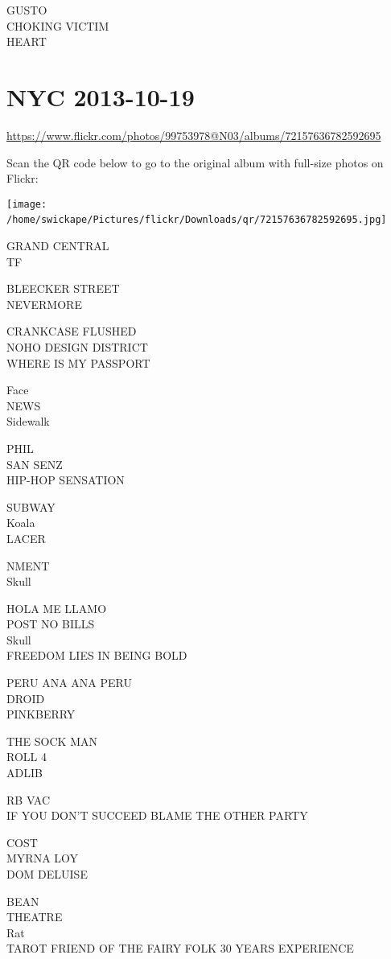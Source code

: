 \documentclass[10pt,letterpaper]{article}
\begin{document}
GUSTO\\
CHOKING VICTIM\\
HEART
\

\section*{NYC 2013-10-19}

\url{https://www.flickr.com/photos/99753978@N03/albums/72157636782592695}

Scan the QR code below to go to the original album with full-size photos on Flickr:

\texttt{[image: /home/swickape/Pictures/flickr/Downloads/qr/72157636782592695.jpg]}
\

GRAND CENTRAL\\
TF

BLEECKER STREET\\
NEVERMORE

CRANKCASE FLUSHED\\
NOHO DESIGN DISTRICT\\
WHERE IS MY PASSPORT

Face\\
NEWS\\
Sidewalk

PHIL\\
SAN SENZ\\
HIP{-}HOP SENSATION

SUBWAY\\
Koala\\
LACER

NMENT\\
Skull

HOLA ME LLAMO\\
POST NO BILLS\\
Skull\\
FREEDOM LIES IN BEING BOLD

PERU ANA ANA PERU\\
DROID\\
PINKBERRY

THE SOCK MAN\\
ROLL 4\\
ADLIB

RB VAC\\
IF YOU DON'T SUCCEED BLAME THE OTHER PARTY

COST\\
MYRNA LOY\\
DOM DELUISE

BEAN\\
THEATRE\\
Rat\\
TAROT FRIEND OF THE FAIRY FOLK 30 YEARS EXPERIENCE
\end{document}
